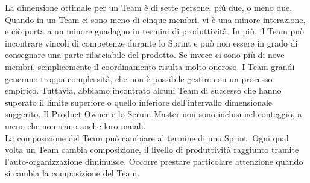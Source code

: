 \linebreak
La dimensione ottimale per un Team \`e di sette persone, pi\`u due, o meno due. Quando in un Team ci sono meno di cinque membri, vi \`e una minore interazione, e ci\`o porta a un minore guadagno in termini di produttivit\`a. In pi\`u, il Team pu\`o incontrare vincoli di competenze durante lo Sprint e pu\`o non essere in grado di consegnare una parte rilasciabile del prodotto. Se invece ci sono pi\`u di nove membri, semplicemente il coordinamento risulta molto oneroso. I Team grandi generano troppa complessit\`a, che non \`e possibile gestire con un processo empirico. Tuttavia, abbiamo incontrato alcuni Team di successo che hanno superato il limite superiore o quello inferiore dell'intervallo dimensionale suggerito. Il Product Owner e lo Scrum Master non sono inclusi nel conteggio, a meno che non siano anche loro maiali.\\
\linebreak
La composizione del Team pu\`o cambiare al termine di uno Sprint. Ogni qual volta un Team cambia composizione, il livello di  produttivit\`a raggiunto tramite l'auto-organizzazione diminuisce. Occorre prestare particolare attenzione quando si cambia la composizione del Team. 
